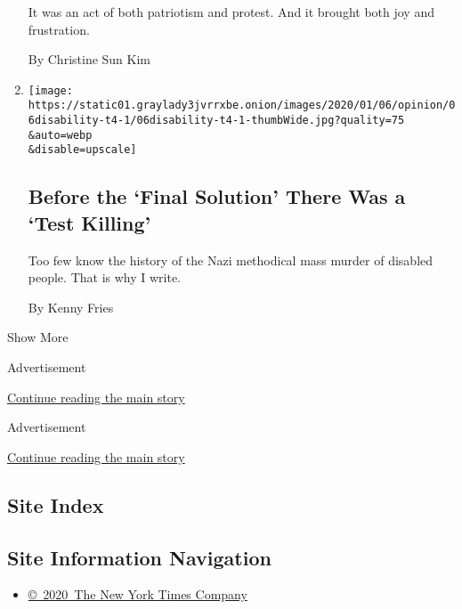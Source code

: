 \begin{enumerate}
  It was an act of both patriotism and protest. And it brought both joy
  and frustration.

  By Christine Sun Kim
\item
  \href{/2020/01/08/opinion/disability-nazi-eugenics.html}{}

  \texttt{[image: https://static01.graylady3jvrrxbe.onion/images/2020/01/06/opinion/06disability-t4-1/06disability-t4-1-thumbWide.jpg?quality=75\\\&auto=webp\\\&disable=upscale]}

  \hypertarget{before-the-final-solution-there-was-a-test-killing}{%
  \subsection{Before the `Final Solution' There Was a `Test
  Killing'}\label{before-the-final-solution-there-was-a-test-killing}}

  Too few know the history of the Nazi methodical mass murder of
  disabled people. That is why I write.

  By Kenny Fries
\end{enumerate}

Show More

Advertisement

\protect\hyperlink{after-mid1}{Continue reading the main story}

Advertisement

\protect\hyperlink{after-mktg}{Continue reading the main story}

\hypertarget{site-index}{%
\subsection{Site Index}\label{site-index}}

\hypertarget{site-information-navigation}{%
\subsection{Site Information
Navigation}\label{site-information-navigation}}

\begin{itemize}
\tightlist
\item
  \href{https://help.nytimes3xbfgragh.onion/hc/en-us/articles/115014792127-Copyright-notice}{©~2020~The
  New York Times Company}
\end{itemize}


